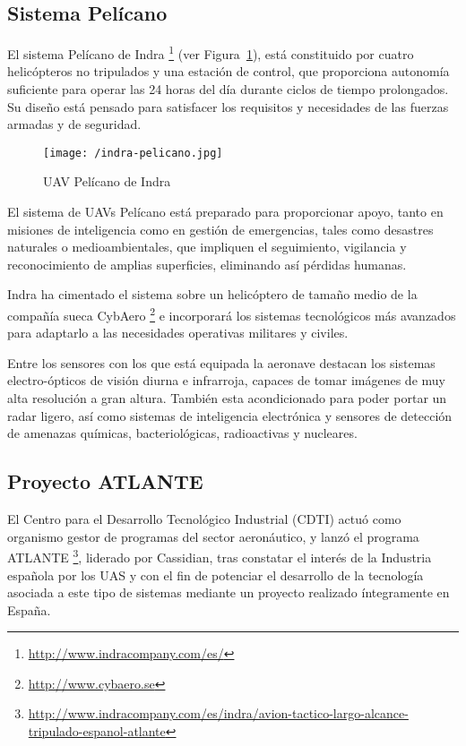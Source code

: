 \subsection{Sistema Pelícano}
\label{sec:pelicano}

El sistema Pelícano de Indra \footnote{\url{http://www.indracompany.com/es/}} (ver Figura~\ref{fig:pelicano}), está constituido por cuatro helicópteros no tripulados y una estación de control, que proporciona autonomía suficiente para operar las 24 horas del día durante ciclos de tiempo prolongados. Su diseño está pensado para satisfacer los requisitos y necesidades de las fuerzas armadas y de seguridad.

\begin{figure}[!h]
\begin{center}
\texttt{[image: /indra-pelicano.jpg]}
\caption[\acs{UAV} Pelícano de Indra]{\acs{UAV} Pelícano de Indra}
\label{fig:pelicano}
\end{center}
\end{figure}

El sistema de \acs{UAV}s Pelícano \cite{PELICANO} está preparado para proporcionar apoyo, tanto en misiones de inteligencia como en gestión de emergencias, tales como desastres naturales o medioambientales, que impliquen el seguimiento, vigilancia y reconocimiento de amplias superficies, eliminando así pérdidas humanas.

Indra ha cimentado el sistema sobre un helicóptero de tamaño medio de la compañía sueca CybAero \footnote{\url{http://www.cybaero.se}} e incorporará los sistemas tecnológicos más avanzados para adaptarlo a las necesidades operativas militares y civiles. 

Entre los sensores con los que está equipada la aeronave destacan los sistemas electro-ópticos de visión diurna e infrarroja, capaces de tomar imágenes de muy alta resolución a gran altura. También esta acondicionado para poder portar un radar ligero, así como sistemas de inteligencia electrónica y sensores de detección de amenazas químicas, bacteriológicas, radioactivas y nucleares.

\subsection{Proyecto ATLANTE}
\label{sec:atlante}

El Centro para el Desarrollo Tecnológico Industrial (CDTI) actuó como organismo gestor de programas del sector aeronáutico, y lanzó el programa \acs{ATLANTE} \footnote{\url{http://www.indracompany.com/es/indra/avion-tactico-largo-alcance-tripulado-espanol-atlante}}, liderado por Cassidian, tras constatar el interés de la Industria española por los \acs{UAS} y con el fin de potenciar el desarrollo de la tecnología asociada a este tipo de sistemas mediante un proyecto realizado íntegramente en España.

